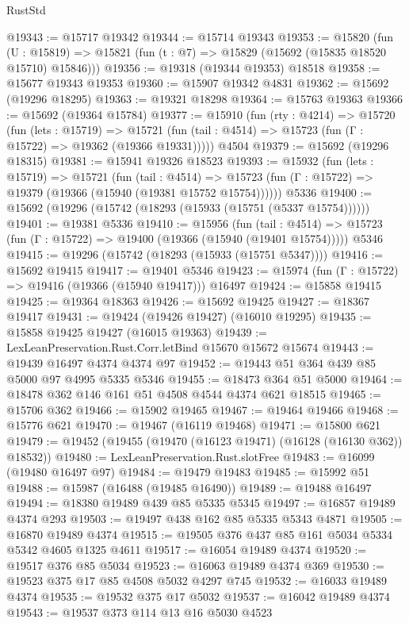 \begin{lexlean}{RustStd}
\begin{coremodule}
@19343 := @15717 @19342
@19344 := @15714 @19343
@19353 := @15820
    (fun (U : @15819) => @15821 (fun (t : @7) => @15829 (@15692 (@15835 @18520 @15710) @15846)))
@19356 := @19318 (@19344 @19353) @18518
@19358 := @15677 @19343 @19353
@19360 := @15907 @19342 @4831
@19362 := @15692 (@19296 @18295)
@19363 := @19321 @18298
@19364 := @15763 @19363
@19366 := @15692 (@19364 @15784)
@19377 := @15910
    (fun (rty : @4214) =>
    @15720
      (fun (lets : @15719) =>
      @15721 (fun (tail : @4514) => @15723 (fun (Γ : @15722) => @19362 (@19366 @19331)))))
    @4504
@19379 := @15692 (@19296 @18315)
@19381 := @15941 @19326 @18523
@19393 := @15932
    (fun (lets : @15719) =>
    @15721
      (fun (tail : @4514) =>
      @15723 (fun (Γ : @15722) => @19379 (@19366 (@15940 (@19381 @15752 @15754))))))
    @5336
@19400 := @15692 (@19296 (@15742 (@18293 (@15933 (@15751 (@5337 @15754))))))
@19401 := @19381 @5336
@19410 := @15956
    (fun (tail : @4514) => @15723 (fun (Γ : @15722) => @19400 (@19366 (@15940 (@19401 @15754)))))
    @5346
@19415 := @19296 (@15742 (@18293 (@15933 (@15751 @5347))))
@19416 := @15692 @19415
@19417 := @19401 @5346
@19423 := @15974 (fun (Γ : @15722) => @19416 (@19366 (@15940 @19417))) @16497
@19424 := @15858 @19415
@19425 := @19364 @18363
@19426 := @15692 @19425
@19427 := @18367 @19417
@19431 := @19424 (@19426 @19427) (@16010 @19295)
@19435 := @15858 @19425 @19427 (@16015 @19363)
@19439 := LexLeanPreservation.Rust.Corr.letBind @15670 @15672 @15674
@19443 := @19439 @16497 @4374 @4374 @97
@19452 := @19443 @51 @364 @439 @85 @5000 @97 @4995 @5335 @5346
@19455 := @18473 @364 @51 @5000
@19464 := @18478 @362 @146 @161 @51 @4508 @4544 @4374 @621 @18515
@19465 := @15706 @362
@19466 := @15902 @19465
@19467 := @19464 @19466
@19468 := @15776 @621
@19470 := @19467 (@16119 @19468)
@19471 := @15800 @621
@19479 := @19452 (@19455 (@19470 (@16123 @19471) (@16128 (@16130 @362)) @18532))
@19480 := LexLeanPreservation.Rust.slotFree
@19483 := @16099 (@19480 @16497 @97)
@19484 := @19479 @19483
@19485 := @15992 @51
@19488 := @15987 (@16488 (@19485 @16490))
@19489 := @19488 @16497
@19494 := @18380 @19489 @439 @85 @5335 @5345
@19497 := @16857 @19489 @4374 @293
@19503 := @19497 @438 @162 @85 @5335 @5343 @4871
@19505 := @16870 @19489 @4374
@19515 := @19505 @376 @437 @85 @161 @5034 @5334 @5342 @4605 @1325 @4611
@19517 := @16054 @19489 @4374
@19520 := @19517 @376 @85 @5034
@19523 := @16063 @19489 @4374 @369
@19530 := @19523 @375 @17 @85 @4508 @5032 @4297 @745
@19532 := @16033 @19489 @4374
@19535 := @19532 @375 @17 @5032
@19537 := @16042 @19489 @4374
@19543 := @19537 @373 @114 @13 @16 @5030 @4523

\end{coremodule}
\end{lexlean}
